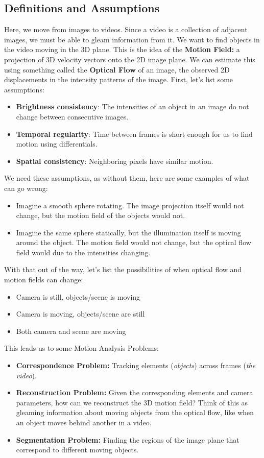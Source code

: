 \documentclass{article}
\begin{document}
\subsection{Definitions and Assumptions}
Here, we move from images to videos. Since a video is a collection of adjacent images, we must be able to gleam information from it. We want to find objects in the video moving in the 3D plane. This is the idea of the \textbf{Motion Field:} a projection of 3D velocity vectors onto the 2D image plane. We can estimate this using something called the \textbf{Optical Flow} of an image, the observed 2D displacements in the intensity patterns of the image. First, let's list some assumptions:
\begin{itemize}
    \item \textbf{Brightness consistency}: The intensities of an object in an image do not change between consecutive images.
    \item \textbf{Temporal regularity}: Time between frames is short enough for us to find motion using differentials.
    \item \textbf{Spatial consistency}: Neighboring pixels have similar motion. 
\end{itemize}
We need these assumptions, as without them, here are some examples of what can go wrong:
\begin{itemize}
    \item Imagine a smooth sphere rotating. The image projection itself would not change, but the motion field of the objects would not.
    \item Imagine the same sphere statically, but the illumination itself is moving around the object. The motion field would not change, but the optical flow field would due to the intensities changing.
\end{itemize}
With that out of the way, let's list the possibilities of when optical flow and motion fields can change:
\begin{itemize}
    \item Camera is still, objects/scene is moving
    \item Camera is moving, objects/scene are still
    \item Both camera and scene are moving
\end{itemize}
This leads us to some Motion Analysis Problems:
\begin{itemize}
    \item \textbf{Correspondence Problem:} Tracking elements (\textit{objects}) across frames (\textit{the video}).
    \item \textbf{Reconstruction Problem:} Given the corresponding elements and camera parameters, how can we reconstruct the 3D motion field? Think of this as gleaming information about moving objects from the optical flow, like when an object moves behind another in a video. 
    \item \textbf{Segmentation Problem:} Finding the regions of the image plane that correspond to different moving objects. 
\end{itemize}
\end{document}
